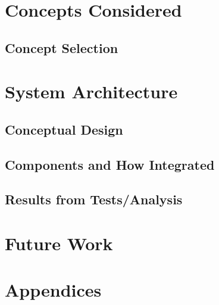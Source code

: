 \documentclass[12pt]{report}
\begin{document}
	\section{Concepts Considered}
		\subsection{Concept Selection}

	\section{System Architecture}
		\subsection{Conceptual Design}

		\subsection{Components and How Integrated}

		\subsection{Results from Tests/Analysis}

	\section{Future Work}
	
	\section{Appendices}
\end{document}
